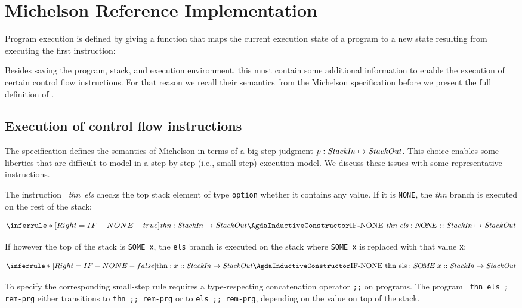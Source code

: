 \section{Michelson Reference Implementation}
\label{sec:refImpl}

Program execution is defined by giving a function that maps
the current execution state of a program to a new state resulting from executing
the first instruction:
\ConcreteprogStep

Besides saving the program, stack, and execution environment, this  must contain
some additional information to enable the execution of certain control flow instructions.
For that reason we recall their semantics from the Michelson specification
before we present the full definition of .

\subsection{Execution of control flow
  instructions}\label{sec:control-flow}

The specification defines the semantics of Michelson in terms of a big-step
judgment $p : \text{\emph{StackIn}} \mapsto
\text{\emph{StackOut}}$. This choice enables some liberties that are
difficult to model in a step-by-step (i.e., small-step) execution
model. We discuss these issues with some representative instructions.

The instruction ~\textit{thn}~\textit{els} checks the top stack element of type \verb/option/
whether it contains any value.
If it is \verb/NONE/, the \textit{thn} branch is executed on the
rest of the stack:

\[	\inferrule*	[Right=IF-NONE-true]
 	{\textit{thn} : \text{\emph{StackIn}} \mapsto \text{\emph{StackOut}}}
 	{\text{\ACon{IF-NONE} }\textit{thn}~\textit{els} : N\!O\!N\!E :: \text{\emph{StackIn}} 
		\mapsto \text{\emph{StackOut}}}
\]

If however the top of the stack is \verb/SOME x/,
the \verb/els/ branch is executed on the stack where \verb/SOME x/
is replaced with that value \verb/x/:

\[	\inferrule*	[Right=IF-NONE-false]
	{\text{thn} : x :: \text{\emph{StackIn}} \mapsto \text{\emph{StackOut}}}
	{\text{\ACon{IF-NONE} thn els} : S\!\!\;O\!M\!E\; x :: \text{\emph{StackIn}} 
		\mapsto \text{\emph{StackOut}}}
\]

To specify the corresponding small-step rule requires a type-respecting concatenation
operator \verb/;;/ on programs. 
The program \verb/ thn els ; rem-prg/ either transitions to
\verb/thn ;; rem-prg/ or to \verb/els ;; rem-prg/,
depending on the value on top of the stack.

